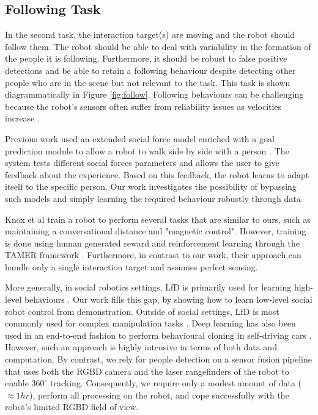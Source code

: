 \documentclass[letterpaper, 10 pt, conference]{ieeeconf}
\begin{document}
\begin{figure}[tbh]
    \vspace{-2mm}

  \label{fig:behaviors}
  \end{figure}

\subsection{Following Task} 

In the second task, the interaction target(s) are moving and the robot should follow them. The robot should be able to deal with variability in the formation of the people it is following. Furthermore, it should be robust to false positive detections and be able to retain a following behaviour despite detecting other people who are in the scene but not relevant to the task. This task is shown diagrammatically in Figure \ref{fig:follow}. Following behaviours can be challenging because the robot's sensors often suffer from reliability issues as velocities increase \cite{kobilarov2006people}.

Previous work used an extended social force model enriched with a goal prediction module to allow a robot to walk side by side with a person \cite{ferrer2016robot}. The system tests different social forces parameters and allows the user to give feedback about the experience. Based on this feedback, the robot learns to adapt itself to the specific person.  Our work investigates the possibility of bypassing such models and simply learning the required behaviour robustly through data.  

Knox et al \cite{knox2013training} train a robot to perform several tasks that are similar to ours, such as maintaining a conversational distance and "magnetic control". However, training is done using human generated reward and reinforcement learning through the TAMER framework \cite{knox2009interactively}. Furthermore, in contrast to our work, their approach can handle only a single interaction target and assumes perfect sensing.

More generally, in social robotics settings, LfD is primarily used for learning high-level behaviours \cite{louie2016learning} \cite{lockerd2004tutelage}. Our work fills this gap, by showing how to learn low-level social robot control from demonstration. Outside of social settings, LfD is most commonly used for complex manipulation tasks \cite{argall2009survey}. Deep learning has also been used in an end-to-end fashion to perform behavioural cloning in self-driving cars \cite{bojarski2016end}. However, such an approach is highly intensive in terms of both data and computation.  By contrast, we rely for people detection on a sensor fusion pipeline that uses both the RGBD camera and the laser rangefinders of the robot to enable $360^\circ$ tracking.  Consequently, we require only a modest amount of data ($\approx 1hr$), perform all processing on the robot, and cope successfully with the robot's limited RGBD field of view.
\end{document}
